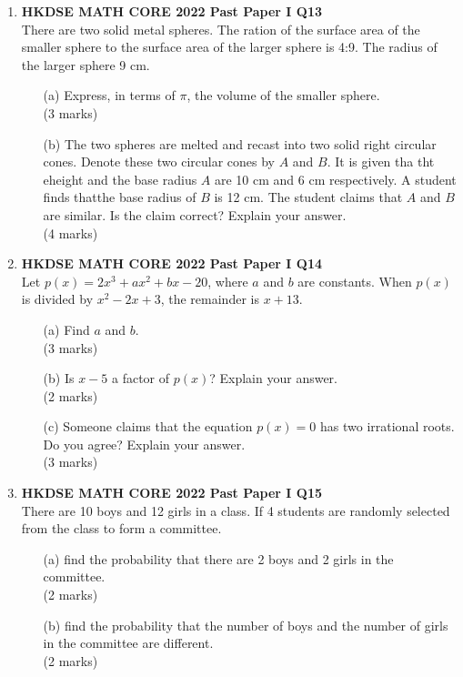 \documentclass[12pt]{article}
\begin{document}
\begin{enumerate}
	\item \textbf{HKDSE MATH CORE 2022 Past Paper I Q13}\\
	There are two solid metal spheres. The ration of the surface area of the smaller sphere to the surface area of the larger sphere is 4:9. The radius of the larger sphere 9 cm.
	\begin{enumerate}
		\item[(a)] Express, in terms of $\pi$, the volume of the smaller sphere. \\(3 marks)
		\item[(b)] The two spheres are melted and recast into two solid right circular cones. Denote these two circular cones by $A$ and $B$. It is given tha tht eheight and the base radius $A$ are 10 cm and 6 cm respectively. A student finds thatthe base radius of $B$ is 12 cm. The student claims that $A$ and $B$ are similar. Is the claim correct? Explain your answer. \\(4 marks)
	\end{enumerate}

	\item \textbf{HKDSE MATH CORE 2022 Past Paper I Q14}\\
	Let $p(x) = 2x^3 + ax^2 + bx - 20$, where $a$ and $b$ are constants. When $p(x)$ is divided by $x^2 - 2x + 3$, the remainder is $x + 13$.
	\begin{enumerate}
		\item[(a)] Find $a$ and $b$. \\(3 marks)
		\item[(b)] Is $x - 5$ a factor of $p(x)$? Explain your answer. \\(2 marks)
		\item[(c)] Someone claims that the equation $p(x) = 0$ has two irrational roots. Do you agree? Explain your answer. \\(3 marks)
	\end{enumerate}

	\item \textbf{HKDSE MATH CORE 2022 Past Paper I Q15}\\
	There are 10 boys and 12 girls in a class. If 4 students are randomly selected from the class to form a committee.
	\begin{enumerate}
		\item[(a)] find the probability that there are 2 boys and 2 girls in the committee. \\(2 marks)
		\item[(b)] find the probability that the number of boys and the number of girls in the committee are different. \\(2 marks)
	\end{enumerate}


\end{enumerate}
\end{document}
